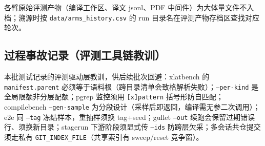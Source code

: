 各臂原始评测产物（编译工作区、译文 jsonl、PDF 中间件）为大体量文件不入档；溯源时按 \texttt{data/arms\_history.csv} 的 run 目录名在评测产物存档区查找对应轮次。

\subsection{过程事故记录（评测工具链教训）}

本批测试记录的评测驱动层教训，供后续批次回避：xlatbench 的 \texttt{manifest.parent} 必须等于语料根（跨目录清单会致格解析失败）；\texttt{--per-kind} 是全局限额非分层配额；pgrep 监控须用 \texttt{[x]pattern} 括号形防自匹配；compilebench \texttt{--gen-sample} 为分段设计（采样后即返回，编译需无参二次调用）；e2e 同 \texttt{--tag} 冻结样本，重抽样须换 tag+seed；gullet \texttt{--out} 续跑会保留过期错误行、须换新目录；stagerun 下游阶段须显式传 \texttt{--ids} 防跨层欠采；多会话共仓提交须走私有 \texttt{GIT\_INDEX\_FILE}（共享索引有 sweep/reset 竞争窗）。
